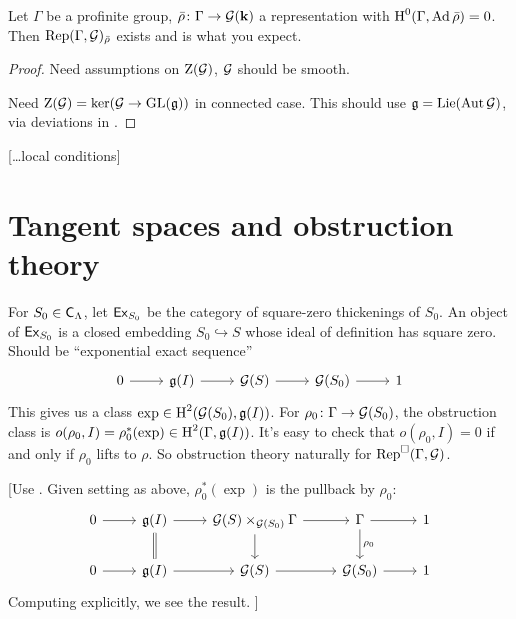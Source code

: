 \documentclass[phd,cornellheadings,draft]{cornell}
\begin{document}
\begin{theorem}
Let $\Gamma$ be a profinite group, $\bar\rho\colon \Gamma\to \mathcal{G}(\mathbf{k})$ a 
representation with $\operatorname{H}^0(\Gamma,\operatorname{Ad}\bar\rho)=0$. Then 
$\operatorname{Rep}(\Gamma,\mathcal{G})_{\bar\rho}$ exists and is what you expect. 
\end{theorem}
\begin{proof}
Need assumptions on $\operatorname{Z}(\mathcal{G})$, $\mathcal{G}$ should be smooth. 

Need $\operatorname{Z}(\mathcal{G})=\ker(\mathcal{G}\to \operatorname{GL}(\mathfrak{g}))$ in connected case. This should use 
$\mathfrak{g}=\operatorname{Lie}(\operatorname{Aut} \mathcal{G})$, via deviations in \cite{sga3-1}. 
\end{proof}

[\ldots local conditions]





\section{Tangent spaces and obstruction theory}

For $S_0\in \mathsf{C}_\Lambda$, let $\mathsf{Ex}_{S_0}$ be the category of square-zero 
thickenings of $S_0$. An object of $\mathsf{Ex}_{S_0}$ is a closed embedding 
$S_0\hookrightarrow S$ whose ideal of definition has square zero. Should be 
``exponential exact sequence''
\[
\begin{tikzcd}
	0 \ar[r]
		& \fg(I) \ar[r]
		& \cG(S) \ar[r]
		& \cG(S_0) \ar[r]
		& 1
\end{tikzcd}
\]
This gives us a class $\exp\in \operatorname{H}^2(\mathcal{G}(S_0),\mathfrak{g}(I))$. For 
$\rho_0\colon \Gamma\to \mathcal{G}(S_0)$, the obstruction class is 
$o(\rho_0,I) = \rho_0^\ast(\exp)\in \operatorname{H}^2(\Gamma,\mathfrak{g}(I))$. It's easy to check 
that $o(\rho_0,I)=0$ if and only if $\rho_0$ lifts to $\rho$. So obstruction 
theory naturally for $\operatorname{Rep}^\square(\Gamma,\mathcal{G})$. 

[Use \cite[6.6.4]{weibel-1994}. Given setting as above, $\rho_0^\ast(\exp)$ is 
the pullback by $\rho_0$:
\[
\begin{tikzcd}
	0 \ar[r] 
		& \fg(I) \ar[r] \ar[d, equals]
		& \cG(S)\times_{\cG(S_0)} \Gamma \ar[r] \ar[d] 
		& \Gamma \ar[d, "\rho_0"] \ar[r]
		& 1 \\
	0 \ar[r] 
		& \fg(I) \ar[r]
		& \cG(S) \ar[r] 
		& \cG(S_0) \ar[r] 
		& 1
\end{tikzcd}
\]
Computing explicitly, we see the result. 
]
\end{document}
